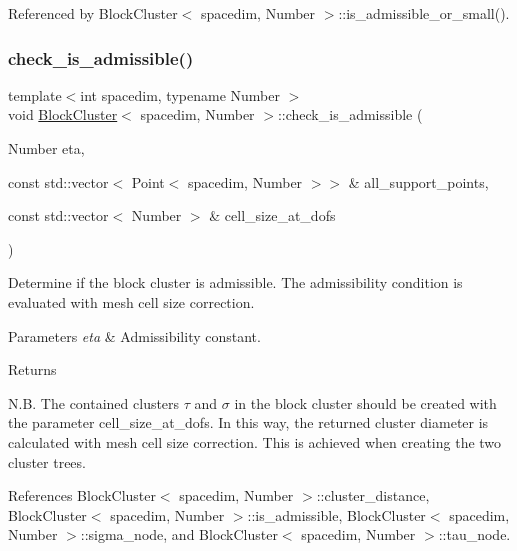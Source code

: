 Referenced by Block\+Cluster$<$ spacedim, Number $>$\+::is\+\_\+admissible\+\_\+or\+\_\+small().

\mbox{\label{classBlockCluster_a79e83ccbdb52032b6b2d83e7d095e62d}} 
\subsubsection{\texorpdfstring{check\+\_\+is\+\_\+admissible()}{check\_is\_admissible()}\hspace{0.1cm}{\footnotesize\ttfamily [2/2]}}
{\footnotesize\ttfamily template$<$int spacedim, typename Number $>$ \\
void \hyperlink{classBlockCluster}{Block\+Cluster}$<$ spacedim, Number $>$\+::check\+\_\+is\+\_\+admissible (\begin{DoxyParamCaption}\item[{Number}]{eta,  }\item[{const std\+::vector$<$ Point$<$ spacedim, Number $>$$>$ \&}]{all\+\_\+support\+\_\+points,  }\item[{const std\+::vector$<$ Number $>$ \&}]{cell\+\_\+size\+\_\+at\+\_\+dofs }\end{DoxyParamCaption})}

Determine if the block cluster is admissible. The admissibility condition is evaluated with mesh cell size correction.


\begin{DoxyParams}{Parameters}
{\em eta} & Admissibility constant. \\
\hline
\end{DoxyParams}
\begin{DoxyReturn}{Returns}

\end{DoxyReturn}
N.\+B. The contained clusters $\tau$ and $\sigma$ in the block cluster should be created with the parameter {\ttfamily cell\+\_\+size\+\_\+at\+\_\+dofs}. In this way, the returned cluster diameter is calculated with mesh cell size correction. This is achieved when creating the two cluster trees.

References Block\+Cluster$<$ spacedim, Number $>$\+::cluster\+\_\+distance, Block\+Cluster$<$ spacedim, Number $>$\+::is\+\_\+admissible, Block\+Cluster$<$ spacedim, Number $>$\+::sigma\+\_\+node, and Block\+Cluster$<$ spacedim, Number $>$\+::tau\+\_\+node.

